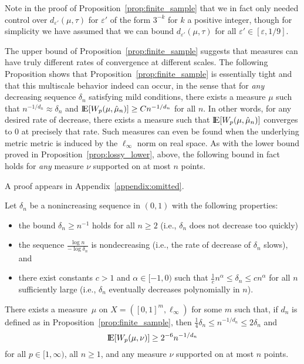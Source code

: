 \documentclass[sts]{imsart}
\newcommand*{\ep}{\varepsilon}
\begin{document}
Note in the proof of Proposition~\ref{prop:finite_sample} that we in fact only needed control over $d_{\ep'}(\mu, \tau)$ for $\ep'$ of the form $3^{-k}$ for $k$ a positive integer, though for simplicity we have assumed that we can bound $d_{\ep'}(\mu, \tau)$ for all $\ep' \in [\ep, 1/9]$.

The upper bound of Proposition~\ref{prop:finite_sample} suggests that measures can have truly different rates of convergence at different scales.
The following Proposition shows that Proposition~\ref{prop:finite_sample} is essentially tight and that this multiscale behavior indeed can occur, in the sense that for \emph{any} decreasing sequence $\delta_n$ satisfying mild conditions, there exists a measure $\mu$ such that $n^{-1/d_n} \approx \delta_n$ and ${\rm I}\kern-0.18em{\rm E}[W_p(\mu, \hat \mu_n)] \geq C n^{-1/d_n}$ for all $n$.
In other words, for any desired rate of decrease, there exists a measure such that ${\rm I}\kern-0.18em{\rm E}[W_p(\mu, \hat \mu_n)]$ converges to $0$ at precisely that rate.
Such measures can even be found when the underlying metric metric is induced by the $\ell_\infty$ norm on real space.
As with the lower bound proved in Proposition~\ref{prop:lossy_lower}, above, the following bound in fact holds for \emph{any} measure $\nu$ supported on at most $n$ points.

A proof appears in Appendix~\ref{appendix:omitted}.
\begin{proposition}\label{prop:finite_sample_converse}
Let $\delta_n$ be a nonincreasing sequence in $(0, 1)$ with the following properties:
\begin{itemize}
\item the bound $\delta_n \geq n^{-1}$ holds for all $n \geq 2$ (i.e., $\delta_n$ does not decrease too quickly)
\item the sequence $\frac{\log n}{- \log \delta_n}$ is nondecreasing (i.e., the rate of decrease of $\delta_n$ slows), and
\item there exist constants $c > 1$ and $\alpha \in [-1, 0)$ such that $\frac 1 c n^\alpha \leq \delta_n \leq c n^\alpha$ for all $n$ sufficiently large (i.e., $\delta_n$ eventually decreases polynomially in $n$).
\end{itemize}

There exists a measure~$\mu$ on $X = ([0, 1]^m, \ell_\infty)$ for some $m$ such that, if $d_n$ is defined as in Proposition~\ref{prop:finite_sample}, then $\frac 1 4 \delta_n \leq n^{-1/d_n} \leq 2 \delta_n$ and
\begin{equation*}
{\rm I}\kern-0.18em{\rm E}[W_p(\mu, \nu)] \geq 2^{-6} n^{-1/d_n}
\end{equation*}
for all $p \in [1, \infty)$, all $n \geq 1$, and any measure $\nu$ supported on at most $n$ points.
\end{proposition}
\end{document}
